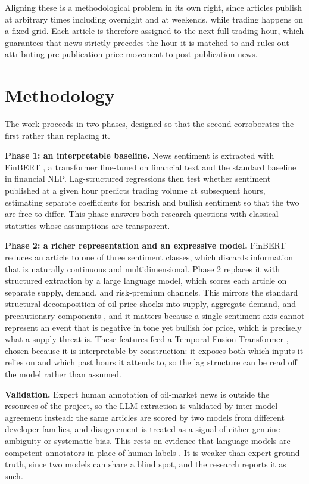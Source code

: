 \documentclass[11pt,a4paper]{article}
\begin{document}
Aligning these is a methodological problem in its own right, since articles publish at arbitrary times including overnight and at weekends, while trading happens on a fixed grid. Each article is therefore assigned to the next full trading hour, which guarantees that news strictly precedes the hour it is matched to and rules out attributing pre-publication price movement to post-publication news.

\section{Methodology}

The work proceeds in two phases, designed so that the second corroborates the first rather than replacing it.

\textbf{Phase 1: an interpretable baseline.} News sentiment is extracted with FinBERT \citep{araci2019}, a transformer fine-tuned on financial text and the standard baseline in financial NLP. Lag-structured regressions then test whether sentiment published at a given hour predicts trading volume at subsequent hours, estimating separate coefficients for bearish and bullish sentiment so that the two are free to differ. This phase answers both research questions with classical statistics whose assumptions are transparent.

\textbf{Phase 2: a richer representation and an expressive model.} FinBERT reduces an article to one of three sentiment classes, which discards information that is naturally continuous and multidimensional. Phase 2 replaces it with structured extraction by a large language model, which scores each article on separate supply, demand, and risk-premium channels. This mirrors the standard structural decomposition of oil-price shocks into supply, aggregate-demand, and precautionary components \citep{kilian2009}, and it matters because a single sentiment axis cannot represent an event that is negative in tone yet bullish for price, which is precisely what a supply threat is. These features feed a Temporal Fusion Transformer \citep{lim2021}, chosen because it is interpretable by construction: it exposes both which inputs it relies on and which past hours it attends to, so the lag structure can be read off the model rather than assumed.

\textbf{Validation.} Expert human annotation of oil-market news is outside the resources of the project, so the LLM extraction is validated by inter-model agreement instead: the same articles are scored by two models from different developer families, and disagreement is treated as a signal of either genuine ambiguity or systematic bias. This rests on evidence that language models are competent annotators in place of human labels \citep{gilardi2023}. It is weaker than expert ground truth, since two models can share a blind spot, and the research reports it as such.
\end{document}
